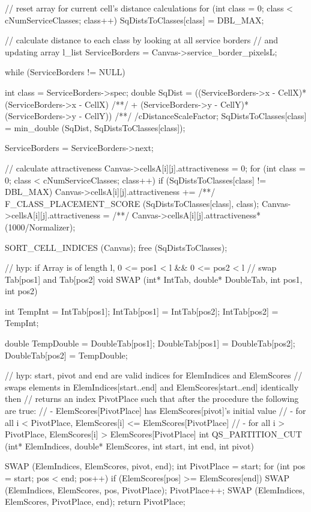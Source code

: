 \begin{C}
{{{{				// reset array for current cell's distance calculations
				for (int class = 0; class < cNumServiceClasses; class++){
					SqDistsToClasses[class] = DBL_MAX;
				}
				
				// calculate distance to each class by looking at all service borders
				// and updating array
				l_list ServiceBorders = Canvas->service_border_pixelsL;
				
				while (ServiceBorders != NULL){
					
					int class = ServiceBorders->spec;
					double SqDist = ((ServiceBorders->x - CellX)*(ServiceBorders->x - CellX)
					/**/ + (ServiceBorders->y - CellY)*(ServiceBorders->y - CellY))
					/**/ /cDistanceScaleFactor;
					SqDistsToClasses[class] = min_double (SqDist, SqDistsToClasses[class]);
					
					ServiceBorders = ServiceBorders->next;
				}
				
				// calculate attractiveness
				Canvas->cellsA[i][j].attractiveness = 0;
				for (int class = 0; class < cNumServiceClasses; class++){
					if (SqDistsToClasses[class] != DBL_MAX){
						Canvas->cellsA[i][j].attractiveness +=
						/**/ F_CLASS_PLACEMENT_SCORE (SqDistsToClasses[class], class);
					}
				}
				Canvas->cellsA[i][j].attractiveness =
				/**/ Canvas->cellsA[i][j].attractiveness*(1000/Normalizer);
			}
		}
	}
	SORT_CELL_INDICES (Canvas);
	free (SqDistsToClasses);
}


// hyp: if Array is of length l, 0 <= pos1 < l && 0 <= pos2 < l
// swap Tab[pos1] and Tab[pos2]
void SWAP (int* IntTab, double* DoubleTab, int pos1, int pos2){
	
	int TempInt = IntTab[pos1];
	IntTab[pos1] = IntTab[pos2];
	IntTab[pos2] = TempInt;
	
	double TempDouble = DoubleTab[pos1];
	DoubleTab[pos1] = DoubleTab[pos2];
	DoubleTab[pos2] = TempDouble;
}


// hyp: start, pivot and end are valid indices for ElemIndices and ElemScores
// swaps elements in ElemIndices[start..end] and ElemScores[start..end] identically then
// returns an index PivotPlace such that after the procedure the following are true:
// - ElemScores[PivotPlace] has ElemScores[pivot]'s initial value
// - for all i < PivotPlace, ElemScores[i] <= ElemScores[PivotPlace]
// - for all i > PivotPlace, ElemScores[i] > ElemScores[PivotPlace]
int QS_PARTITION_CUT (int* ElemIndices, double* ElemScores, int start, int end, int pivot){
	
	SWAP (ElemIndices, ElemScores, pivot, end);
	int PivotPlace = start;
	for (int pos = start; pos < end; pos++){
		if (ElemScores[pos] >= ElemScores[end]){
			SWAP (ElemIndices, ElemScores, pos, PivotPlace);
			PivotPlace++;
		}
	}
	SWAP (ElemIndices, ElemScores, PivotPlace, end);
	return PivotPlace;
}



\end{C}
